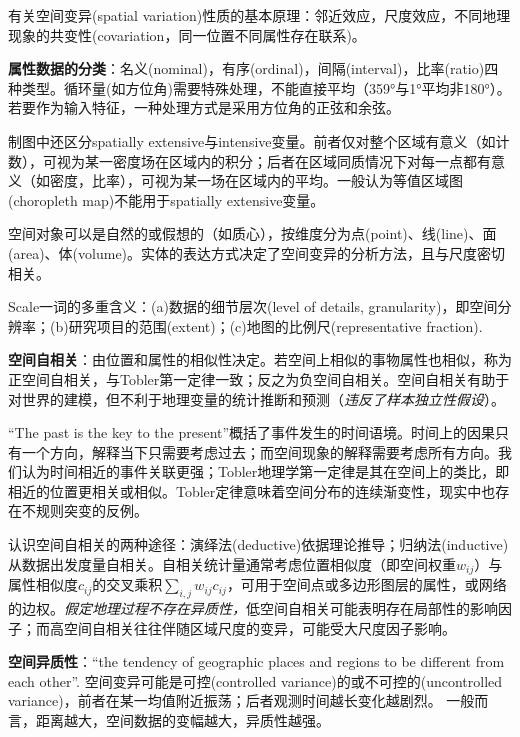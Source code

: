 \par 有关空间变异(spatial variation)性质的基本原理：邻近效应，尺度效应，不同地理现象的共变性(covariation，同一位置不同属性存在联系)。
\par \textbf{属性数据的分类}：名义(nominal)，有序(ordinal)，间隔(interval)，比率(ratio)四种类型。循环量(如方位角)需要特殊处理，不能直接平均（359°与1°平均非180°）。若要作为输入特征，一种处理方式是采用方位角的正弦和余弦。
\par 制图中还区分spatially extensive与intensive变量。前者仅对整个区域有意义（如计数），可视为某一密度场在区域内的积分；后者在区域同质情况下对每一点都有意义（如密度，比率），可视为某一场在区域内的平均。一般认为等值区域图(choropleth map)不能用于spatially extensive变量。
\par 空间对象可以是自然的或假想的（如质心），按维度分为点(point)、线(line)、面(area)、体(volume)。实体的表达方式决定了空间变异的分析方法，且与尺度密切相关。
\par Scale一词的多重含义：(a)数据的细节层次(level of details, granularity)，即空间分辨率；(b)研究项目的范围(extent)；(c)地图的比例尺(representative fraction).

\par \textbf{空间自相关}：由位置和属性的相似性决定。若空间上相似的事物属性也相似，称为正空间自相关，与Tobler第一定律一致；反之为负空间自相关。空间自相关有助于对世界的建模，但不利于地理变量的统计推断和预测（\emph{违反了样本独立性假设}）。
\par ``The past is the key to the present''概括了事件发生的时间语境。时间上的因果只有一个方向，解释当下只需要考虑过去；而空间现象的解释需要考虑所有方向。我们认为时间相近的事件关联更强；Tobler地理学第一定律是其在空间上的类比，即相近的位置更相关或相似。Tobler定律意味着空间分布的连续渐变性，现实中也存在不规则突变的反例。
\par 认识空间自相关的两种途径：演绎法(deductive)依据理论推导；归纳法(inductive)从数据出发度量自相关。自相关统计量通常考虑位置相似度（即空间权重$w_{ij}$）与属性相似度$c_{ij}$的交叉乘积$\sum_{i,j}w_{ij}c_{ij}$，可用于空间点或多边形图层的属性，或网络的边权。\emph{假定地理过程不存在异质性，}低空间自相关可能表明存在局部性的影响因子；而高空间自相关往往伴随区域尺度的变异，可能受大尺度因子影响。

\par \textbf{空间异质性}：``the tendency of geographic places and regions to be different from each other''. 空间变异可能是可控(controlled variance)的或不可控的(uncontrolled variance)，前者在某一均值附近振荡；后者观测时间越长变化越剧烈。 一般而言，距离越大，空间数据的变幅越大，异质性越强。

